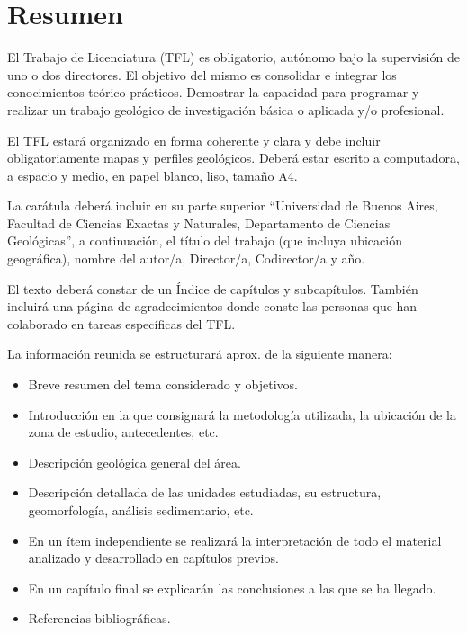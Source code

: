 \documentclass[11pt,a4paper]{article}
\begin{document}
\thispagestyle{empty}
\section*{\Huge Resumen}
El Trabajo de Licenciatura (TFL) es obligatorio, autónomo bajo la supervisión de uno o dos directores. El objetivo del mismo es  consolidar e integrar los conocimientos teórico-prácticos. Demostrar la capacidad para programar y realizar un trabajo geológico de investigación básica o aplicada y/o profesional.\par
El TFL estará organizado en forma coherente y clara y debe incluir obligatoriamente mapas y perfiles geológicos. Deberá estar escrito a computadora, a espacio y medio, en papel blanco, liso, tamaño A4.\par
La carátula deberá incluir en su parte superior “Universidad de Buenos Aires, Facultad de Ciencias Exactas y Naturales, Departamento de Ciencias Geológicas”, a continuación, el título del trabajo (que incluya ubicación geográfica), nombre del autor/a, Director/a, Codirector/a y año.\par
El texto deberá constar de un Índice de capítulos y subcapítulos. También incluirá una página de agradecimientos donde conste las personas que han colaborado en tareas específicas del TFL.\par
La información reunida se estructurará aprox. de la siguiente manera:
\begin{itemize}
    \item Breve resumen del tema considerado y objetivos.
    \item Introducción en la que consignará la metodología utilizada, la ubicación de la zona de estudio, antecedentes, etc.
    \item Descripción geológica general del área.
    \item Descripción detallada de las unidades estudiadas, su estructura, geomorfología, análisis sedimentario, etc.
    \item En un ítem independiente se realizará la interpretación de todo el material analizado y desarrollado en capítulos previos.
    \item En un capítulo final se explicarán las conclusiones a las que se ha llegado.
    \item Referencias bibliográficas.
\end{itemize}
\end{document}

